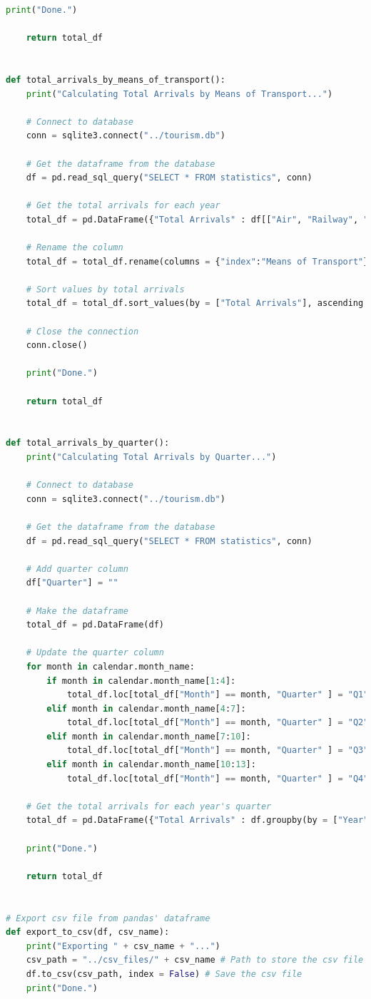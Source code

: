 \documentclass[a4paper]{article}
\begin{document}
\begin{lstlisting}[language=Python, caption=dataframe.py]
    print("Done.")

    return total_df


def total_arrivals_by_means_of_transport():
    print("Calculating Total Arrivals by Means of Transport...")

    # Connect to database
    conn = sqlite3.connect("../tourism.db")

    # Get the dataframe from the database
    df = pd.read_sql_query("SELECT * FROM statistics", conn)
    
    # Get the total arrivals for each year
    total_df = pd.DataFrame({"Total Arrivals" : df[["Air", "Railway", "Sea", "Road"]].sum()}).reset_index()

    # Rename the column
    total_df = total_df.rename(columns = {"index":"Means of Transport"})
    
    # Sort values by total arrivals
    total_df = total_df.sort_values(by = ["Total Arrivals"], ascending = False)

    # Close the connection
    conn.close()

    print("Done.")

    return total_df


def total_arrivals_by_quarter():
    print("Calculating Total Arrivals by Quarter...")

    # Connect to database
    conn = sqlite3.connect("../tourism.db")

    # Get the dataframe from the database
    df = pd.read_sql_query("SELECT * FROM statistics", conn)

    # Add quarter column
    df["Quarter"] = ""

    # Make the dataframe
    total_df = pd.DataFrame(df)

    # Update the quarter column
    for month in calendar.month_name:
        if month in calendar.month_name[1:4]:
            total_df.loc[total_df["Month"] == month, "Quarter" ] = "Q1"
        elif month in calendar.month_name[4:7]:
            total_df.loc[total_df["Month"] == month, "Quarter" ] = "Q2"
        elif month in calendar.month_name[7:10]:
            total_df.loc[total_df["Month"] == month, "Quarter" ] = "Q3"
        elif month in calendar.month_name[10:13]:
            total_df.loc[total_df["Month"] == month, "Quarter" ] = "Q4"

    # Get the total arrivals for each year's quarter
    total_df = pd.DataFrame({"Total Arrivals" : df.groupby(by = ["Year", "Quarter"])[["Air", "Railway", "Sea", "Road"]].sum().sum(axis=1)}).reset_index()

    print("Done.")

    return total_df


# Export csv file from pandas' dataframe
def export_to_csv(df, csv_name):
    print("Exporting " + csv_name + "...")
    csv_path = "../csv_files/" + csv_name # Path to store the csv file
    df.to_csv(csv_path, index = False) # Save the csv file
    print("Done.")

\end{lstlisting}
\end{document}
